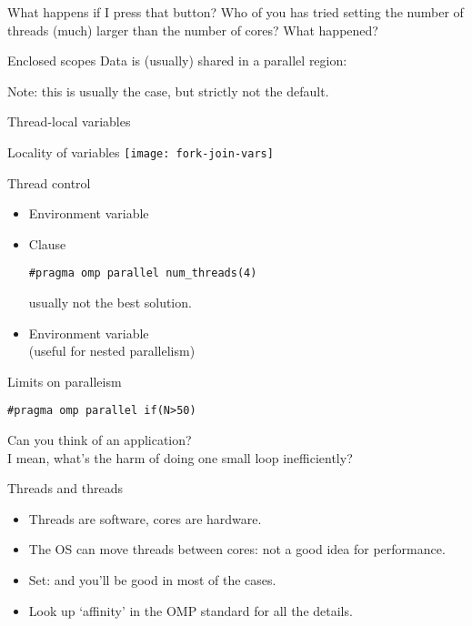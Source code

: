 \begin{numberedframe}{What happens if I press that button?}
  Who of you has tried setting the number of threads (much) larger
  than the number of cores? What happened?
\end{numberedframe}

\begin{numberedframe}{Enclosed scopes}
  Data is (usually) shared in a parallel region:
  
  Note: this is usually the case,
  but strictly not the default.
\end{numberedframe}

\begin{numberedframe}{Thread-local variables}
  
\end{numberedframe}

\begin{numberedframe}{Locality of variables}
  \texttt{[image: fork-join-vars]}
\end{numberedframe}

\begin{numberedframe}{Thread control}
  \begin{itemize}
  \item Environment variable 
  \item Clause \\
\begin{lstlisting}
#pragma omp parallel num_threads(4)
\end{lstlisting}
    usually not the best solution.
  \item Environment variable \\
    (useful for nested parallelism)
  \end{itemize}
\end{numberedframe}

\begin{numberedframe}{Limits on paralleism}
\begin{lstlisting}
#pragma omp parallel if(N>50)
\end{lstlisting}
Can you think of an application?\\
I mean, what's the harm of doing one small loop inefficiently?
\end{numberedframe}

\begin{numberedframe}{Threads and threads}
  \begin{itemize}    
  \item Threads are software, cores are hardware.
  \item The OS can move threads between cores: not a good idea for
    performance.
  \item Set:  and you'll be good in
    most of the cases.
  \item Look up `affinity' in the OMP standard for all the details.
  \end{itemize}
\end{numberedframe}

